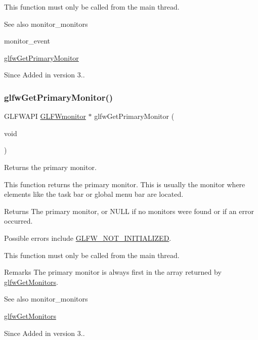 This function must only be called from the main thread.

\begin{DoxySeeAlso}{See also}
monitor\+\_\+monitors 

monitor\+\_\+event 

\hyperlink{group__monitor_ga34befff4f9f0fae09dd8de6fb0eb4f3e}{glfw\+Get\+Primary\+Monitor}
\end{DoxySeeAlso}
\begin{DoxySince}{Since}
Added in version 3.. 
\end{DoxySince}
\mbox{\label{group__monitor_ga34befff4f9f0fae09dd8de6fb0eb4f3e}} 
\subsubsection{\texorpdfstring{glfw\+Get\+Primary\+Monitor()}{glfwGetPrimaryMonitor()}}
{\footnotesize\ttfamily G\+L\+F\+W\+A\+PI \hyperlink{group__monitor_ga8d9efd1cde9426692c73fe40437d0ae3}{G\+L\+F\+Wmonitor} $\ast$ glfw\+Get\+Primary\+Monitor (\begin{DoxyParamCaption}\item[{void}]{ }\end{DoxyParamCaption})}



Returns the primary monitor. 

This function returns the primary monitor. This is usually the monitor where elements like the task bar or global menu bar are located.

\begin{DoxyReturn}{Returns}
The primary monitor, or {\ttfamily N\+U\+LL} if no monitors were found or if an error occurred.
\end{DoxyReturn}
Possible errors include \hyperlink{group__errors_ga2374ee02c177f12e1fa76ff3ed15e14a}{G\+L\+F\+W\+\_\+\+N\+O\+T\+\_\+\+I\+N\+I\+T\+I\+A\+L\+I\+Z\+ED}.

This function must only be called from the main thread.

\begin{DoxyRemark}{Remarks}
The primary monitor is always first in the array returned by \hyperlink{group__monitor_ga8c78e5db186ee10d00c053faf81998af}{glfw\+Get\+Monitors}.
\end{DoxyRemark}
\begin{DoxySeeAlso}{See also}
monitor\+\_\+monitors 

\hyperlink{group__monitor_ga8c78e5db186ee10d00c053faf81998af}{glfw\+Get\+Monitors}
\end{DoxySeeAlso}
\begin{DoxySince}{Since}
Added in version 3.. 
\end{DoxySince}
\mbox{\label{group__monitor_ga21f7f60de4f4d0fa360c7ad159b75c9e}} 
